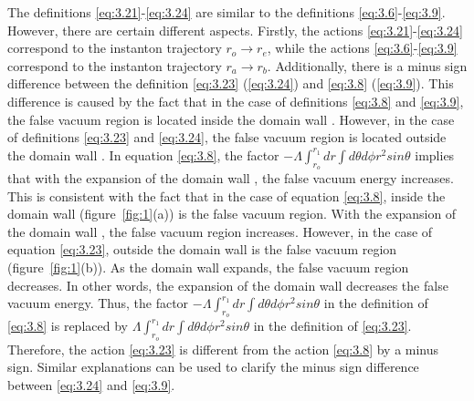 \documentclass[12pt]{article}
\begin{document}
The definitions \eqref{eq:3.21}-\eqref{eq:3.24} are similar to the definitions \eqref{eq:3.6}-\eqref{eq:3.9}. However, there are certain different aspects. Firstly, the actions \eqref{eq:3.21}-\eqref{eq:3.24} correspond to the instanton trajectory $r_{o}\rightarrow r_{e}$, while the actions \eqref{eq:3.6}-\eqref{eq:3.9} correspond to the instanton trajectory $r_{a}\rightarrow r_{b}$. Additionally, there is a minus sign difference between the definition \eqref{eq:3.23} (\eqref{eq:3.24}) and \eqref{eq:3.8} (\eqref{eq:3.9}).  This difference is caused by the fact that in the case of definitions \eqref{eq:3.8} and \eqref{eq:3.9}, the false vacuum region is located inside the domain wall \uppercase\expandafter{}. However,  in the case of definitions \eqref{eq:3.23} and \eqref{eq:3.24}, the false vacuum region is located outside the domain wall \uppercase\expandafter{}. In equation \eqref{eq:3.8}, the factor $-\Lambda\int_{r_{o}}^{r_{1}}dr\int d\theta d\phi r^{2}sin \theta$ implies that with the expansion of the domain wall \uppercase\expandafter{}, the false vacuum energy increases. This is consistent with the fact that in the case of equation \eqref{eq:3.8}, inside the domain wall \uppercase\expandafter{} (figure~\ref{fig:1}(a)) is the false vacuum region. With the expansion of the domain wall \uppercase\expandafter{}, the false vacuum region increases. However, in the case of equation \eqref{eq:3.23}, outside the domain wall \uppercase\expandafter{} is the false vacuum region (figure~\ref{fig:1}(b)). As the domain wall \uppercase\expandafter{} expands, the false vacuum region decreases. In other words, the expansion of the domain wall \uppercase\expandafter{} decreases the false vacuum energy. Thus, the factor  $-\Lambda\int_{r_{o}}^{r_{1}}dr\int d\theta d\phi r^{2}sin \theta$ in the definition of \eqref{eq:3.8} is replaced by $\Lambda\int_{r_{o}}^{r_{1}}dr\int d\theta d\phi r^{2}sin \theta$ in the definition of \eqref{eq:3.23}. Therefore, the action \eqref{eq:3.23} is different from the action \eqref{eq:3.8} by a minus sign. Similar explanations can be used to clarify the minus sign difference between \eqref{eq:3.24} and \eqref{eq:3.9}.
\end{document}
